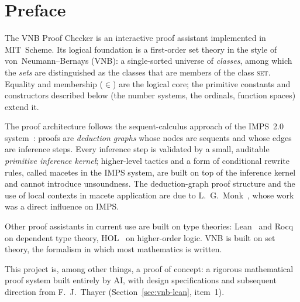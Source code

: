 \chapter*{Preface}
\label{ch:preface}

\begin{sloppypar}The VNB Proof Checker is an interactive proof assistant implemented in
MIT~Scheme.  Its logical foundation is a first-order set theory in the
style of von~Neumann--Bernays (VNB): a single-sorted universe of
\emph{classes}, among which the \emph{sets} are distinguished as the
classes that are members of the class \textsc{set}.  Equality and
membership ($\in$) are the logical core; the primitive constants and
constructors described below (the number systems, the ordinals, function
spaces) extend it.\end{sloppypar}

The proof architecture follows the sequent-calculus approach of the
IMPS~2.0 system~\cite{IMPS}: proofs are \emph{deduction graphs} whose
nodes are sequents and whose edges are inference steps.  Every
inference step is validated by a small, auditable \emph{primitive
inference kernel}; higher-level tactics and a form of conditional
rewrite rules, called macetes in the IMPS system, are built on top of
the inference kernel and cannot introduce unsoundness.
The deduction-graph proof structure and the use of local contexts in
macete application are due to L.~G.~Monk~\cite{Monk1988}, whose work
was a direct influence on IMPS.

Other proof assistants in current use are built on type theories:
Lean~\cite{Lean} and Rocq~\cite{Rocq} on dependent type theory,
HOL~\cite{HOL} on higher-order logic.  VNB is built on set theory, the
formalism in which most mathematics is written.

This project is, among other things, a proof of concept: a rigorous
mathematical proof system built entirely by AI, with design
specifications and subsequent direction from F.~J.~Thayer
(Section~\ref{sec:vnb-lean}, item~1).
